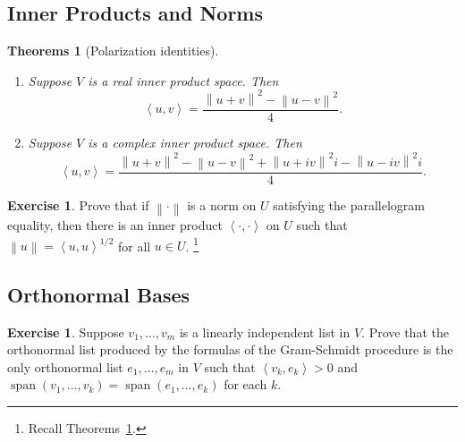 \documentclass[nofonts,colorlinks]{tufte-handout}
\theoremstyle{plain} %
\newtheorem{thms}[thm]{Theorems}
\theoremstyle{definition}
\newtheorem{exer}[thm]{Exercise}
\theoremstyle{remark}
\newcommand{\norm}[1]{\mathopen{}\left\lVert#1\right\rVert}
\newcommand{\inp}[2]{\mathopen{}\left\langle#1,#2\right\rangle}
\newcommand{\R}{\mathbf{R}}
\DeclareMathOperator{\spn}{span}
\begin{document}
\subsection{Inner Products and Norms}
\begin{thms}[Polarization identities]
	\begin{enumerate}
		\item Suppose $V$ is a real inner product space. Then
		\[\inp{u}{v}=\frac{\norm{u+v}^2-\norm{u-v}^2}{4}.\]
		\item Suppose $V$ is a complex inner product space. Then
		\[\inp{u}{v}=\frac{\norm{u+v}^2-\norm{u-v}^2+\norm{u+iv}^2i-\norm{u-iv}^2i}{4}.\]
	\end{enumerate}
	\label{thm: polarization identities}
\end{thms}

\begin{exer}\label{exer: condition for a norm-induced inner product}
	Prove that if $\norm{\cdot}$ is a norm on $U$ satisfying the parallelogram equality, then there is an inner product $\inp{\cdot}{\cdot}$ on $U$ such that $\norm{u}=\inp{u}{u}^{1/2}$ for all $u\in U$.%
	\footnote{Recall Theorems~\ref{thm: polarization identities}.}
\end{exer}



\subsection{Orthonormal Bases}
\begin{exer}
	Suppose $v_1,\dots,v_m$ is a linearly independent list in $V$. Prove that the orthonormal list produced by the formulas of the Gram-Schmidt procedure is the only orthonormal list $e_1,\dots,e_m$ in $V$ such that $\inp{v_k}{e_k}>0$ and $\spn(v_1,\dots,v_k)=\spn(e_1,\dots,e_k)$ for each $k$.
\end{exer}
\end{document}
